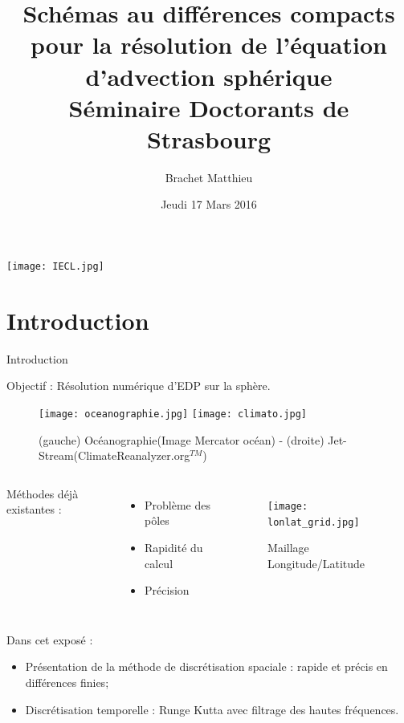 \documentclass[11pt]{beamer}
\title[\'Equation d'advection sur la sphère]{Schémas au différences compacts pour la résolution de l'équation d'advection sphérique\\
\small{Séminaire Doctorants de Strasbourg}}
\author{Brachet Matthieu}
\date[17.03.2017]{Jeudi 17 Mars 2016}
\institute[IECL]{Institut Elie Cartan de Lorraine}
\begin{document}
\begin{frame}
\titlepage
\begin{center}
\texttt{[image: IECL.jpg]}
\end{center}
\end{frame}


\section{Introduction}
\begin{frame}{Introduction}
  \begin{block}{Objectif :}
    Résolution numérique d'EDP sur la sphère.
  \end{block}
\begin{figure}
\begin{center}
\texttt{[image: oceanographie.jpg]}
\hspace{2cm}
\texttt{[image: climato.jpg]}
\caption{(gauche) Océanographie(Image Mercator océan) - (droite)
  Jet-Stream(ClimateReanalyzer.org$^{TM}$)}
\end{center}
\end{figure}
\end{frame}

\begin{frame}
\begin{columns}
  Méthodes déjà existantes :
  \begin{itemize}
    \item Problème des pôles
    \item Rapidité du calcul
    \item Précision
  \end{itemize}
\begin{figure}
\texttt{[image: lonlat\_grid.jpg]}
\caption{Maillage Longitude/Latitude}
\end{figure}
\end{columns}
\pause

  \begin{exampleblock}{Dans cet exposé :}
    \begin{itemize}
    \item Présentation de la méthode de discrétisation spaciale : rapide et précis en différences finies;
    \item Discrétisation temporelle : Runge Kutta avec filtrage des hautes fréquences.  
    \end{itemize}
  \end{exampleblock}
\end{frame}
\end{document}
